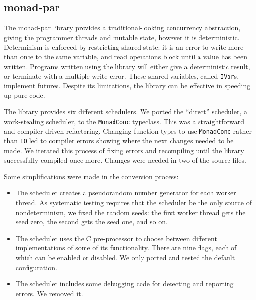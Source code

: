 \FloatBarrier

\subsection{monad-par}
\label{sec:dejafu-casestudies-par}

The monad-par library\cite{monad_par,marlow2011} provides a
traditional-looking concurrency abstraction, giving the programmer
threads and mutable state, however it is deterministic.  Determinism
is enforced by restricting shared state: it is an error to write more
than once to the same variable, and read operations block until a
value has been written.  Programs written using the library will
either give a deterministic result, or terminate with a multiple-write
error.  These shared variables, called \verb|IVar|s, implement
futures\cite{marlow2011}.  Despite its limitations, the library can be
effective in speeding up pure code\cite{marlow2011}.

The library provides six different schedulers.  We ported the
``direct'' scheduler, a work-stealing scheduler, to the
\verb|MonadConc| typeclass.  This was a straightforward and
compiler-driven refactoring.  Changing function types to use
\verb|MonadConc| rather than \verb|IO| led to compiler errors showing
where the next changes needed to be made.  We iterated this process of
fixing errors and recompiling until the library successfully compiled
once more.  Changes were needed in two of the source files.

Some simplifications were made in the conversion process:

\begin{itemize}
\item The scheduler creates a pseudorandom number generator for each
  worker thread.  As systematic testing requires that the scheduler be
  the only source of nondeterminism, we fixed the random seeds: the
  first worker thread gets the seed zero, the second gets the seed
  one, and so on.
\item The scheduler uses the C pre-processor to choose between
  different implementations of some of its functionality.  There are
  nine flags, each of which can be enabled or disabled.  We only
  ported and tested the default configuration.
\item The scheduler includes some debugging code for detecting and
  reporting errors.  We removed it.
\end{itemize}

